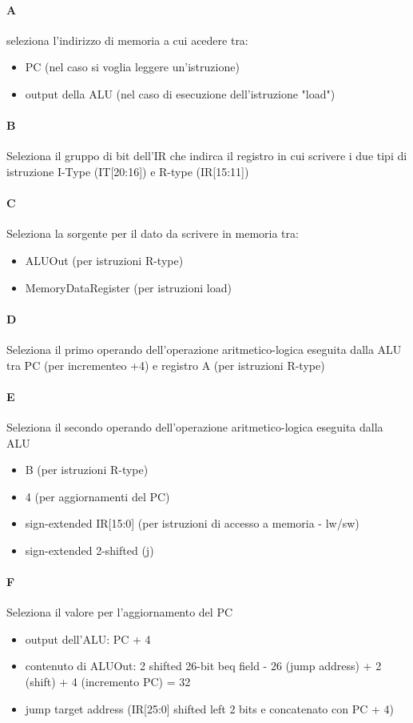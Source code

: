 \documentclass[12pt, a4paper, openany]{book}
\begin{document}
\paragraph*{A} seleziona l'indirizzo di memoria a cui acedere tra:
\begin{itemize}
    \item PC (nel caso si voglia leggere un'istruzione)
    \item output della ALU (nel caso di esecuzione dell'istruzione "load")
\end{itemize}
\paragraph*{B} Seleziona il gruppo di bit dell'IR che indirca il registro in cui scrivere
i due tipi di istruzione I-Type (IT[20:16]) e R-type (IR[15:11])
\paragraph*{C}Seleziona la sorgente per il dato da scrivere in memoria tra:
\begin{itemize}
    \item ALUOut (per istruzioni R-type)
    \item MemoryDataRegister (per istruzioni load)
\end{itemize}
\paragraph*{D} Seleziona il primo operando dell'operazione aritmetico-logica eseguita
dalla ALU tra PC (per incrementeo +4) e registro A (per istruzioni R-type)
\paragraph*{E} Seleziona il secondo operando dell'operazione aritmetico-logica eseguita
dalla ALU
\begin{itemize}
    \item B (per istruzioni R-type)
    \item 4 (per aggiornamenti del PC)
    \item sign-extended IR[15:0] (per istruzioni di accesso a memoria - lw/sw)
    \item sign-extended 2-shifted (j)
\end{itemize}
\paragraph*{F} Seleziona il valore per l'aggiornamento del PC
\begin{itemize}
    \item output dell'ALU: PC + 4
    \item contenuto di ALUOut: 2 shifted 26-bit beq field - 26 (jump address) + 2 (shift) + 4 (incremento PC) = 32
    \item jump target address (IR[25:0] shifted left 2 bits e concatenato con PC + 4)
\end{itemize}
\end{document}

